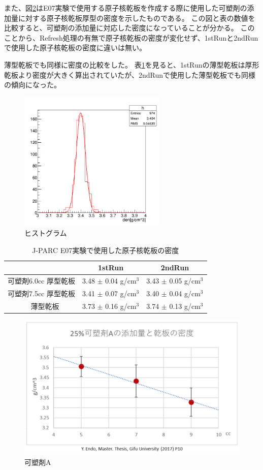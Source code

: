 \documentclass[12pt,a4paper]{jarticle}
\begin{document}
また、図\ref{fig:kasozai}はE07実験で使用する原子核乾板を作成する際に使用した可塑剤の添加量に対する原子核乾板厚型の密度を示したものである。
この図と表の数値を比較すると、可塑剤の添加量に対応した密度になっていることが分かる。
このことから、Refresh処理の有無で原子核乾板の密度が変化せず、1stRunと2ndRunで使用した原子核乾板の密度に違いは無い。
\par
薄型乾板でも同様に密度の比較をした。
表\ref{tab:compare_E07_12}を見ると、1stRunの薄型乾板は厚形乾板より密度が大きく算出されていたが、2ndRunで使用した薄型乾板でも同様の傾向になった。
\begin{figure}[htbp]
  \centering
     \includegraphics[width=70mm]{thick75_den.png}
  \caption{ヒストグラム\label{fig:hisuto}}
\end{figure}
\begin{table}[htbp]
  \centering
  \caption{J-PARC E07実験で使用した原子核乾板の密度\label{tab:compare_E07_12}}
  \begin{tabular}{c|c|c}
  　　　&1stRun&2ndRun\\
  \hline
  \hline
  可塑剤6.0cc 厚型乾板 & 3.48 $\pm$ 0.04 g/cm$^3$ & 3.43 $\pm$ 0.05 g/cm$^3$ \\
  可塑剤7.5cc 厚型乾板 & 3.41 $\pm$ 0.07 g/cm$^3$ & 3.40 $\pm$ 0.04 g/cm$^3$ \\
　薄型乾板 & 3.73 $\pm$ 0.16 g/cm$^3$ & 3.74 $\pm$ 0.13 g/cm$^3$  \\
  \hline
  \end{tabular}
  \end{table}
\begin{figure}[htbp]
  \centering
     \includegraphics[width=140mm]{kasozai.png}
  \caption{可塑剤A\label{fig:kasozai}}
\end{figure}
\newpage
\end{document}
